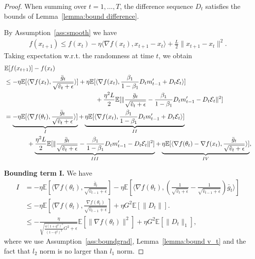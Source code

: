 \documentclass[11pt]{article}
\begin{document}
\begin{proof}
When summing over $t=1,...,T$, the difference sequence $D_t$ satisfies the bounds of Lemma~\ref{lemma:bound difference}.




By Assumption~\ref{ass:smooth} we have
\begin{align*}
    f(x_{t+1})\leq f(x_t)-\eta\langle \nabla f(x_t), x_{t+1}-x_t\rangle+\frac{L}{2}\| x_{t+1}-x_t\|^2.
\end{align*}
Taking expectation w.r.t. the randomness at time $t$, we obtain 
\begin{align}
    &\mathbb E[f(x_{t+1})]-f(x_t) \nonumber\\
    &\leq -\eta\mathbb E[\langle \nabla f(x_t), \frac{\bar g_t}{\sqrt{\hat v_t+\epsilon}}\rangle]+\eta \mathbb E[\langle \nabla f(x_t), \frac{\beta_1}{1-\beta_1}D_tm_{t-1}'+D_t\mathcal E_t\rangle] \nonumber\\
    &\hspace{2in} +\frac{\eta^2L}{2}\mathbb E[\|\frac{\bar g_t}{\sqrt{\hat v_t+\epsilon}}-\frac{\beta_1}{1-\beta_1}D_tm_{t-1}'- D_t\mathcal E_t\|^2] \nonumber\\
    &=\underbrace{-\eta\mathbb E[\langle \nabla f(\theta_t), \frac{\bar g_t}{\sqrt{\hat v_t+\epsilon}}\rangle]}_{I}+\underbrace{\eta \mathbb E[\langle \nabla f(x_t), \frac{\beta_1}{1-\beta_1}D_tm_{t-1}'+D_t\mathcal E_t\rangle]}_{II} \nonumber\\
    &\hspace{0.5in} +\underbrace{\frac{\eta^2L}{2}\mathbb E[\|\frac{\bar g_t}{\sqrt{\hat v_t+\epsilon}}-\frac{\beta_1}{1-\beta_1}D_tm_{t-1}'- D_t\mathcal E_t\|^2]}_{III}+\underbrace{\eta\mathbb E[\langle \nabla f(\theta_t)-\nabla f(x_t), \frac{\bar g_t}{\sqrt{\hat v_t+\epsilon}} \rangle]}_{IV}, \label{eq0}
\end{align}

\textbf{Bounding term I.} We have
\begin{align}
    I&=-\eta\mathbb E[\langle \nabla f(\theta_t), \frac{\bar g_t}{\sqrt{\hat v_{t-1}+\epsilon}}]-\eta\mathbb E[\langle \nabla f(\theta_t), (\frac{1}{\sqrt{\hat v_t+\epsilon}}-\frac{1}{\sqrt{\hat v_{t-1}+\epsilon}})\bar g_t\rangle] \nonumber\\
    &\leq -\eta\mathbb E[\langle \nabla f(\theta_t), \frac{\nabla f(\theta_t)}{\sqrt{\hat v_{t-1}+\epsilon}}]+\eta G^2\mathbb E[\|D_t\|].  \nonumber\\
    &\leq -\frac{\eta}{\sqrt{\frac{4(1+q^2)^3}{(1-q^2)^2}G^2+\epsilon}}\mathbb E[\|\nabla f(\theta_t)\|^2]+\eta G^2\mathbb E[\|D_t\|_1], \label{eq:I}
\end{align}
where we use Assumption~\ref{ass:boundgrad}, Lemma~\ref{lemma:bound v_t} and the fact that $l_2$ norm is no larger than $l_1$ norm.


\end{proof}
\end{document}
